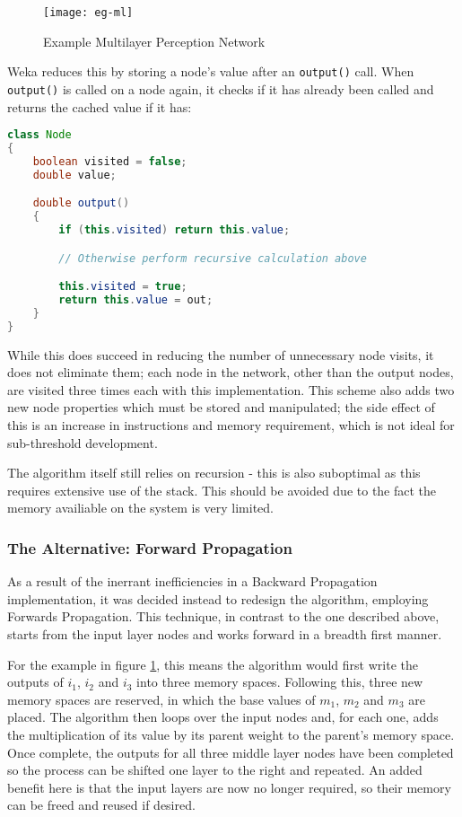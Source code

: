 \begin{figure}[!h]
    \centering
    \texttt{[image: eg-ml]}
    \caption{Example Multilayer Perception Network}
    \label{fig:eg-ml}
\end{figure}

Weka reduces this by storing a node's value after an \verb|output()| call. When \verb|output()| is called on a node again, it checks if it has already been called and returns the cached value if it has:

\begin{lstlisting}[language=Java,caption={Weka's method of preventing repeated calculations}]
class Node
{
    boolean visited = false;
    double value;

    double output()
    {
        if (this.visited) return this.value;

        // Otherwise perform recursive calculation above

        this.visited = true;
        return this.value = out;
    }
}
\end{lstlisting}

While this does succeed in reducing the number of unnecessary node visits, it does not eliminate them; each node in the network, other than the output nodes, are visited three times each with this implementation. This scheme also adds two new node properties which must be stored and manipulated; the side effect of this is an increase in instructions and memory requirement, which is not ideal for sub-threshold development.

The algorithm itself still relies on recursion - this is also suboptimal as this requires extensive use of the stack. This should be avoided due to the fact the memory availiable on the system is very limited.

\subsubsection{The Alternative: Forward Propagation}

As a result of the inerrant inefficiencies in a Backward Propagation implementation, it was decided instead to redesign the algorithm, employing Forwards Propagation. This technique, in contrast to the one described above, starts from the input layer nodes and works forward in a breadth first manner.

For the example in figure \ref{fig:eg-ml}, this means the algorithm would first write the outputs of $i_1$, $i_2$ and $i_3$ into three memory spaces. Following this, three new memory spaces are reserved, in which the base values of $m_1$, $m_2$ and $m_3$ are placed. The algorithm then loops over the input nodes and, for each one, adds the multiplication of its value by its parent weight to the parent's memory space. Once complete, the outputs for all three middle layer nodes have been completed so the process can be shifted one layer to the right and repeated. An added benefit here is that the input layers are now no longer required, so their memory can be freed and reused if desired.


